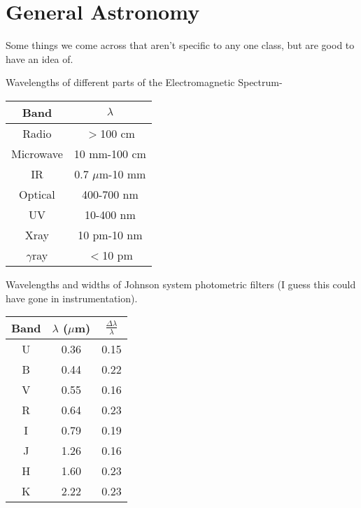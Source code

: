 \section{General Astronomy}
Some things we come across that aren't specific to any one class, but are 
good to have an idea of.

Wavelengths of different parts of the Electromagnetic Spectrum-
\begin{table}[H]
\centering
\begin{tabular}{c c}
\hline\hline
Band&$\lambda$\\
\hline
Radio&$>$100 cm\\
Microwave&10 mm-100 cm\\
IR&0.7 $\mu$m-10 mm\\
Optical&400-700 nm\\
UV&10-400 nm\\
Xray&10 pm-10 nm\\
$\gamma$ray&$<$10  pm\\
\hline
\end{tabular}
\end{table}


Wavelengths and widths of Johnson system photometric filters (I guess this 
could have gone in instrumentation).
\begin{table}[H]
\centering
\begin{tabular}{c c c}
\hline\hline
Band&$\lambda$ ($\mu$m)&$\frac{\Delta\lambda}{\lambda}$\\
\hline
U&0.36&0.15\\
B&0.44&0.22\\
V&0.55&0.16\\
R&0.64&0.23\\
I&0.79&0.19\\
J&1.26&0.16\\
H&1.60&0.23\\
K&2.22&0.23\\
\hline
\end{tabular}
\end{table}
